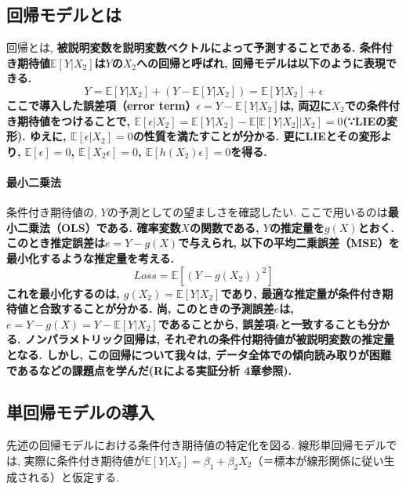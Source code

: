 \documentclass[paper=a4paper,fontsize=10pt]{jlreq}
\begin{document}
\subsection{回帰モデルとは}
回帰とは,  \rmfamily\mcfamily\bfseries{被説明変数を説明変数ベクトルによって予測}\mdseries することである. 条件付き期待値$\mathbb{E}[Y|X_{2}]$は\rmfamily\mcfamily\bfseries{$Y$の$X_{2}$への回帰}\mdseries と呼ばれ, 回帰モデルは以下のように表現できる. 
\begin{equation*}
  Y = \mathbb{E}[Y|X_{2}]+(Y-\mathbb{E}[Y|X_{2}])=\mathbb{E}[Y|X_{2}]+\epsilon
\end{equation*}
ここで導入した\rmfamily\mcfamily\bfseries{誤差項（error term）}\mdseries $\epsilon=Y-\mathbb{E}[Y|X_{2}]$は, 両辺に$X_{2}$での条件付き期待値をつけることで, $\mathbb{E}[\epsilon|X_{2}]=\mathbb{E}[Y|X_{2}]-\mathbb{E}[\mathbb{E}[Y|X_{2}]|X_{2}]=0$(∵LIEの変形). ゆえに, $\mathbb{E}[\epsilon|X_{2}]=0$の性質を満たすことが分かる. 更にLIEとその変形より, $\mathbb{E}[\epsilon]=0$, $\mathbb{E}[X_{2}\epsilon]=0$, $\mathbb{E}[h(X_{2})\epsilon]=0$を得る.\\

\paragraph{最小二乗法}
条件付き期待値の, $Y$の予測としての望ましさを確認したい. ここで用いるのは\rmfamily\mcfamily\bfseries{最小二乗法（OLS）}\mdseries である. 確率変数$X$の関数である, $Y$の推定量を$g(X)$とおく. このとき\rmfamily\mcfamily\bfseries{推定誤差}\mdseries は$e=Y-g(X)$で与えられ, 以下の平均二乗誤差（MSE）を最小化するような推定量を考える.
\begin{equation*}
  Loss=\mathbb{E}[(Y-g(X_2))^{2}]
\end{equation*}
これを最小化するのは, $g(X_2)=\mathbb{E}[Y|X_{2}]$であり, 最適な推定量が条件付き期待値と合致することが分かる. 尚, このときの予測誤差$e$は, $e=Y-g(X)=Y-\mathbb{E}[Y|X_{2}]$であることから, 誤差項$\epsilon$と一致することも分かる. ノンパラメトリック回帰は, それぞれの条件付期待値が被説明変数の推定量となる. しかし, この回帰について我々は, データ全体での傾向読み取りが困難であるなどの課題点を学んだ(Rによる実証分析 4章参照).\\

\subsection{単回帰モデルの導入}
先述の回帰モデルにおける条件付き期待値の特定化を図る. 線形単回帰モデルでは, 実際に条件付き期待値が$\mathbb{E}[Y|X_{2}]=\beta_1+\beta_2X_{2}$（＝標本が線形関係に従い生成される）と仮定する. \\
\end{document}
